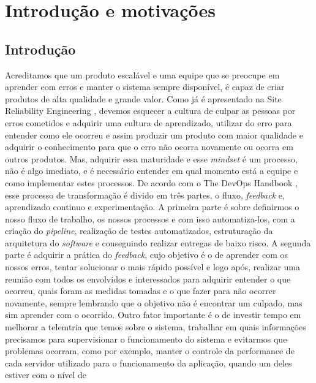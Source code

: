 \part{Introdução e motivações}

  \chapter{Introdução}
    Acreditamos que um produto escalável e uma equipe que se preocupe em aprender
    com erros e manter o sistema sempre disponível, é capaz de criar produtos de
    alta qualidade e grande valor. \newline
    Como já é apresentado na Site Reliability Engineering \cite{SiteReliabilityEngineering},
    devemos esquecer a cultura de culpar as pessoas por erros cometidos e adquirir
    uma cultura de aprendizado, utilizar do erro para entender como ele ocorreu e
    assim produzir um produto com maior qualidade e adquirir o conhecimento para
    que o erro não ocorra novamente ou ocorra em outros produtos. Mas, adquirir essa
    maturidade e esse \textit{mindset} é um processo, não é algo imediato, e é
    necessário entender em qual momento está a equipe e como implementar estes
    processos. \newline
    De acordo com o The DevOps Handbook \cite{TheDevOpsHandbook}, esse processo de
    transformação é divido em três partes, o fluxo, \textit{feedback} e, aprendizado
    continuo e experimentação. A primeira parte é sobre definirmos o nosso fluxo de
    trabalho, os nossos processos e com isso automatiza-los, com a criação do
    \textit{pipeline}, realização de testes automatizados, estruturação da arquitetura
    do \textit{software} e conseguindo realizar entregas de baixo risco. A segunda
    parte é adquirir a prática do \textit{feedback}, cujo objetivo é o de aprender
    com os nossos erros, tentar solucionar o mais rápido possível e logo após, realizar
    uma reunião com todos os envolvidos e interessados para adquirir entender o que
    ocorreu, quais foram as medidas tomadas e o que fazer para não ocorrer novamente,
    sempre lembrando que o objetivo não é encontrar um culpado, mas sim aprender com
    o ocorrido. Outro fator importante é o de investir tempo em melhorar a telemtria
    que temos sobre o sistema, trabalhar em quais informações precisamos para
    supervisionar o funcionamento do sistema e evitarmos que problemas ocorram,
    como por exemplo, manter o controle da performance de cada servidor utilizado
    para o funcionamento da aplicação, quando um deles estiver com o nível de

